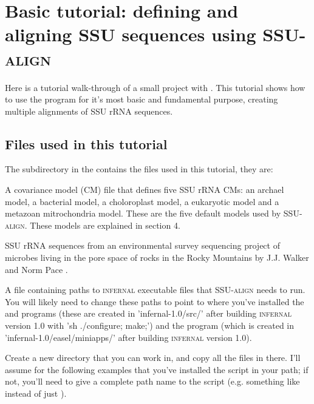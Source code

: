 \section{Basic tutorial: defining and aligning SSU sequences using \textsc{SSU-align}}

Here is a tutorial walk-through of a small project with
. This tutorial shows how to use the program for
it's most basic and fundamental purpose, creating multiple
alignments of SSU rRNA sequences. 

\subsection{Files used in this tutorial}

The subdirectory  in the 
contains the files used in this tutorial, they are:

  \begin{sreitems}{}
  \item[\prog{ssu.default.0p1.cm}] A covariance model (CM) file that
    defines five SSU rRNA CMs: an archael model, a bacterial model, a
    choloroplast model, a eukaryotic model and a metazoan
    mitrochondria model. These are the five default models used by
    \textsc{SSU-align}. These models are explained in section 4.
  \item[\prog{rocks.fa}] SSU rRNA sequences from an environmental
    survey sequencing project of microbes living in the pore space of
    rocks in the Rocky Mountains by J.J. Walker and Norm Pace
    \cite{Walker07}. 
  \item[\prog{1p0.params}] A file containing paths to
    \textsc{infernal} executable files that \textsc{SSU-align} needs
    to run. You will likely need to change these paths to point to
    where you've installed the  and 
    programs (these are created in 'infernal-1.0/src/' after building
    \textsc{infernal} version 1.0 with 'sh ./configure; make;') and
    the  program (which is created in
    'infernal-1.0/easel/miniapps/' after building \textsc{infernal}
    version 1.0).
  \end{sreitems}

Create a new directory that you can work in, and copy all the files in
 there. I'll assume for the following examples that
you've installed the  script in your path; if not,
you'll need to give a complete path name to the script
(e.g. something like
\newline
{} 
instead of just ).

